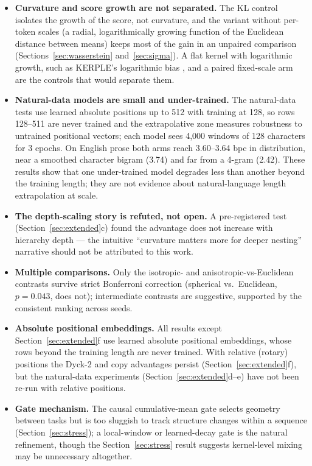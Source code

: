 \documentclass[11pt]{article}
\begin{document}
\begin{itemize}
\item \textbf{Curvature and score growth are not separated.} The KL control isolates the growth of the score, not curvature, and the variant without per-token scales (a radial, logarithmically growing function of the Euclidean distance between means) keeps most of the gain in an unpaired comparison (Sections~\ref{sec:wasserstein} and~\ref{sec:sigma}). A flat kernel with logarithmic growth, such as KERPLE's logarithmic bias \cite{chi2022kerple}, and a paired fixed-scale arm are the controls that would separate them.
\item \textbf{Natural-data models are small and under-trained.} The natural-data tests use learned absolute positions up to 512 with training at 128, so rows 128--511 are never trained and the extrapolative zone measures robustness to untrained positional vectors; each model sees 4,000 windows of 128 characters for 3 epochs. On English prose both arms reach 3.60--3.64 bpc in distribution, near a smoothed character bigram (3.74) and far from a 4-gram (2.42). These results show that one under-trained model degrades less than another beyond the training length; they are not evidence about natural-language length extrapolation at scale.
\item \textbf{The depth-scaling story is refuted, not open.} A pre-registered test (Section~\ref{sec:extended}c) found the advantage does not increase with hierarchy depth --- the intuitive ``curvature matters more for deeper nesting'' narrative should not be attributed to this work.
\item \textbf{Multiple comparisons.} Only the isotropic- and anisotropic-vs-Euclidean contrasts survive strict Bonferroni correction (spherical vs.\ Euclidean, $p = 0.043$, does not); intermediate contrasts are suggestive, supported by the consistent ranking across seeds.
\item \textbf{Absolute positional embeddings.} All results except Section~\ref{sec:extended}f use learned absolute positional embeddings, whose rows beyond the training length are never trained. With relative (rotary) positions the Dyck-2 and copy advantages persist (Section~\ref{sec:extended}f), but the natural-data experiments (Section~\ref{sec:extended}d--e) have not been re-run with relative positions.
\item \textbf{Gate mechanism.} The causal cumulative-mean gate selects geometry between tasks but is too sluggish to track structure changes within a sequence (Section~\ref{sec:stress}); a local-window or learned-decay gate is the natural refinement, though the Section~\ref{sec:stress} result suggests kernel-level mixing may be unnecessary altogether.

\end{itemize}
\end{document}
